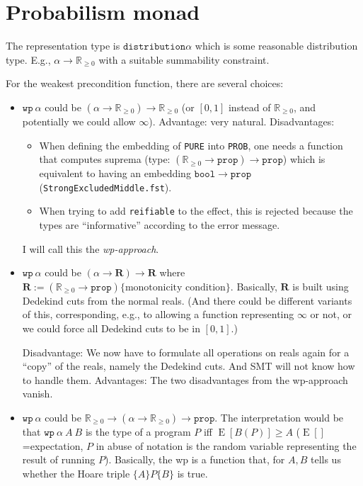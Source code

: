 \documentclass[a4paper]{article}
\newcommand\setR{\mathbb R}
\newcommand\Rpos{\setR_{\geq0}}
\newcommand\prop{\mathtt{prop}}
\renewcommand\wp{\mathtt{wp}}
\newcommand\E{\operatorname E}
\begin{document}
\section{Probabilism monad}

The representation type is $\mathtt{distribution} \alpha$ which is
some reasonable distribution type. E.g., $\alpha\to \Rpos$
with a suitable summability constraint.

For the weakest precondition function, there are several choices:
\begin{itemize}
\item $\mathtt{wp}\ \alpha$ could be
  $(\alpha\to\Rpos)\to \Rpos$ (or $[0,1]$ instead of
  $\Rpos$, and potentially we could allow $\infty$). Advantage: very
  natural. Disadvantages:
  \begin{itemize}
  \item When defining the embedding of \texttt{PURE} into
    \texttt{PROB}, one needs a function that computes suprema (type:
    $(\Rpos\to\prop)\to\prop$) which is equivalent to having an
    embedding $\mathtt{bool}\to\prop$
    (\texttt{StrongExcludedMiddle.fst}).
  \item When trying to add \texttt{reifiable} to the effect, this is
    rejected because the types are ``informative'' according to the
    error message.
  \end{itemize}
  I will call this the \emph{wp-approach}.
\item $\mathtt{wp}\ \alpha$ could be
  $(\alpha\to\mathbf{R})\to \mathbf{R}$ where
  $\mathbf{R} := (\Rpos\to\prop)\{\text{monotonicity condition}\}$.
  Basically, $\mathbf R$ is built using Dedekind cuts from the normal
  reals.  (And there could be different variants of this,
  corresponding, e.g., to allowing a function representing $\infty$ or
  not, or we could force all Dedekind cuts to be in $[0,1]$.)

  Disadvantage: We now have to formulate all operations on reals again
  for a ``copy'' of the reals, namely the Dedekind cuts. And SMT will
  not know how to handle them. Advantages: The two disadvantages from
  the wp-approach vanish.
\item $\mathtt{wp}\ \alpha$ could be
  $\Rpos\to(\alpha\to\Rpos)\to\prop$. The interpretation would be that
  $\wp\ \alpha\ A\ B$ is the type of a program $P$ iff
  $\E[B(P)]\geq A$ ($\E[]$=expectation, $P$ in abuse of notation is
  the random variable representing the result of running $P$).
  Basically, the wp is a function that, for $A,B$ tells us whether the
  Hoare triple $\{A\}P\{B\}$ is true.


\end{itemize}
\end{document}
